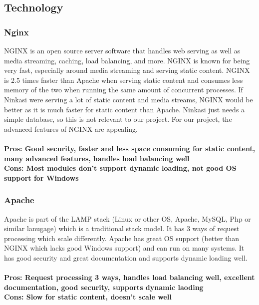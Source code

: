 \documentclass[draftclsnofoot,onecolumn,letterpaper,10pt,compsoc]{IEEEtran}
\begin{document}
      \subsection{Technology}
  			\subsubsection{Nginx}
				NGINX is an open source server software that handles web serving as well as media streaming, caching, load balancing, and more\cite{NGINX}.
				NGINX is known for being very fast, especially around media streaming and serving static content\cite{NGINX}.
				NGINX is 2.5 times faster than Apache when serving static content and consumes less memory of the two when running the same amount of concurrent processes\cite{HostingAd}.
				If Ninkasi were serving a lot of static content and media streams, NGINX would be better as it is much faster for static content than Apache.
				Ninkasi just needs a simple database, so this is not relevant to our project.
				For our project, the advanced features of NGINX are appealing.
				\\ \\
				\textbf{Pros: Good security, faster and less space consuming for static content, many advanced features, handles load balancing well}
				\\
				\textbf{Cons: Most modules don't support dynamic loading, not good OS support for Windows}

  			\subsubsection{Apache}
				Apache is part of the LAMP stack (Linux or other OS, Apache, MySQL, Php or similar lanugage) which is a traditional stack model\cite{UpWork}.
				It has 3 ways of request processing which scale differently.
				Apache has great OS support (better than NGINX which lacks good Windows support) and can run on many systems\cite{HostingAd}.
				It has good security and great documentation and supports dynamic loading well\cite{HostingAd}.
				\\ \\
				\textbf{Pros: Request processing 3 ways, handles load balancing well, excellent documentation, good security, supports dynamic laoding}
				\\
				\textbf{Cons: Slow for static content, doesn't scale well}
\end{document}
